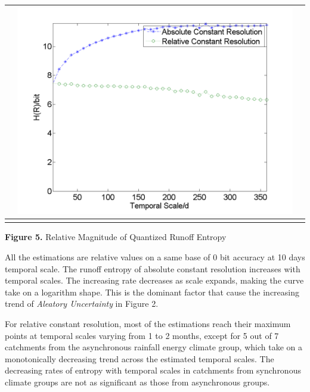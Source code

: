 \documentclass[review]{elsarticle}
\begin{document}
\begin{table}[H]
{\begin{tabular}{ccc}
&\begin{minipage}{.6\textwidth}\includegraphics[width=\linewidth]{resultgraph/e11532500.png}\end{minipage}
\\
\hline
\\
\end{tabular}
}
\Large{\textbf{Figure 5.} Relative Magnitude of Quantized Runoff Entropy }
\end{table}

All the estimations are relative values on a same base of 0 bit accuracy at 10 days temporal scale. The runoff entropy of absolute constant resolution increases with temporal scales. The increasing rate decreases as scale expands, making the  curve take on a logarithm shape. This is the dominant factor that cause the increasing trend of \emph{Aleatory Uncertainty} in Figure 2. 

For relative constant resolution, most of the estimations reach their maximum points at temporal scales varying from    
1 to 2 months, except for 5 out of 7 catchments from the asynchronous rainfall energy climate group, which take on a monotonically decreasing trend across the estimated temporal scales. The decreasing rates of entropy with temporal scales in catchments from synchronous climate groups are not as significant as those from asynchronous groups. 
\end{document}
